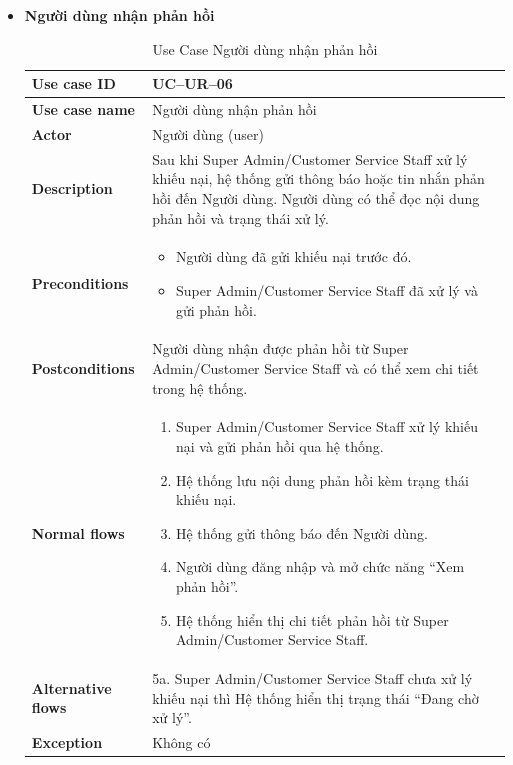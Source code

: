 \begin{itemize}
\item \textbf{Người dùng nhận phản hồi}
\begin{longtable}{|m{}|m{}|}
          \caption{Use Case Người dùng nhận phản hồi} \\
  \hline
  \textbf{Use case ID} & UC--UR--06 \\
  \hline
  \textbf{Use case name} & Người dùng nhận phản hồi \\
  \hline
  \textbf{Actor} & Người dùng (user) \\
  \hline
  \textbf{Description} & Sau khi Super Admin/Customer Service Staff xử lý khiếu nại, hệ thống gửi thông báo hoặc tin nhắn phản hồi đến Người dùng. Người dùng có thể đọc nội dung phản hồi và trạng thái xử lý. \\
  \hline
  \textbf{Preconditions} &
  \begin{itemize}
    \item Người dùng đã gửi khiếu nại trước đó.
    \item Super Admin/Customer Service Staff đã xử lý và gửi phản hồi.
  \end{itemize}\\
  \hline
  \textbf{Postconditions} & Người dùng nhận được phản hồi từ Super Admin/Customer Service Staff và có thể xem chi tiết trong hệ thống. \\
  \hline
  \textbf{Normal flows} &
  \begin{enumerate}[label=\arabic*.]
    \item Super Admin/Customer Service Staff xử lý khiếu nại và gửi phản hồi qua hệ thống.
    \item Hệ thống lưu nội dung phản hồi kèm trạng thái khiếu nại.
    \item Hệ thống gửi thông báo đến Người dùng.
    \item Người dùng đăng nhập và mở chức năng “Xem phản hồi”.
    \item Hệ thống hiển thị chi tiết phản hồi từ Super Admin/Customer Service Staff.
  \end{enumerate}\\
  \hline
  \textbf{Alternative flows} &
  5a. Super Admin/Customer Service Staff chưa xử lý khiếu nại thì Hệ thống hiển thị trạng thái “Đang chờ xử lý”.\\
  \hline
  \textbf{Exception} & Không có\\
  \hline
  \end{longtable}
\end{itemize}

